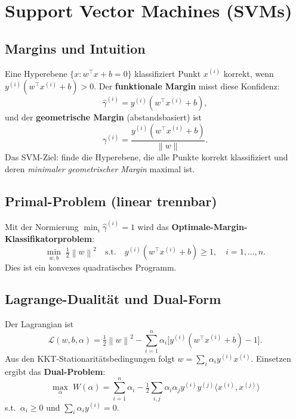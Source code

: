\documentclass[11pt]{article}
\theoremstyle{csthm}
\theoremstyle{csdef}
\newcommand{\norm}[1]{\left\|#1\right\|}
\newcommand{\T}{^\top}
\begin{document}
\section{Support Vector Machines (SVMs)}

\subsection{Margins und Intuition}

Eine Hyperebene $\{x : w\T x + b = 0\}$ klassifiziert Punkt $x^{(i)}$
korrekt, wenn $y^{(i)}(w\T x^{(i)} + b) > 0$. Der \textbf{funktionale
Margin} misst diese Konfidenz:
\begin{equation}
  \hat\gamma^{(i)} = y^{(i)}(w\T x^{(i)} + b),
\end{equation}
und der \textbf{geometrische Margin} (abstandsbasiert) ist
\begin{equation}
  \gamma^{(i)} = \frac{y^{(i)}(w\T x^{(i)} + b)}{\norm{w}}.
\end{equation}
Das SVM-Ziel: finde die Hyperebene, die alle Punkte korrekt klassifiziert
und deren \emph{minimaler geometrischer Margin} maximal ist.

\subsection{Primal-Problem (linear trennbar)}

Mit der Normierung $\min_i \hat\gamma^{(i)} = 1$ wird das
\textbf{Optimale-Margin-Klassifikatorproblem}:
\begin{equation}
  \min_{w,b}\; \tfrac{1}{2}\norm{w}^2 \quad
  \text{s.t.}\quad y^{(i)}(w\T x^{(i)} + b) \geq 1, \quad i=1,\ldots,n.
\end{equation}
Dies ist ein konvexes quadratisches Programm.

\subsection{Lagrange-Dualität und Dual-Form}

Der Lagrangian ist
\[
  \mathcal{L}(w,b,\alpha)
  = \tfrac{1}{2}\norm{w}^2 - \sum_{i=1}^n \alpha_i
    \bigl[y^{(i)}(w\T x^{(i)} + b) - 1\bigr].
\]
Aus den KKT-Stationaritätsbedingungen folgt $w = \sum_i \alpha_i y^{(i)} x^{(i)}$.
Einsetzen ergibt das \textbf{Dual-Problem}:
\begin{equation}
  \max_\alpha\; W(\alpha) = \sum_{i=1}^n \alpha_i
    - \tfrac{1}{2}\sum_{i,j} \alpha_i\alpha_j y^{(i)} y^{(j)} \langle x^{(i)}, x^{(j)}\rangle
\end{equation}
s.t.\ $\alpha_i \geq 0$ und $\sum_i \alpha_i y^{(i)} = 0$.
\end{document}
